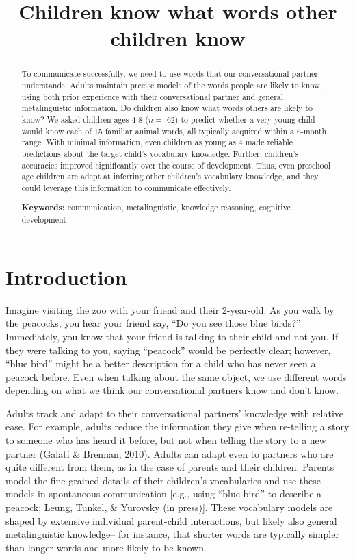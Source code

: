 \documentclass[10pt, letterpaper]{article}
\title{Children know what words other children know}
\begin{document}
\maketitle

\begin{abstract}
To communicate successfully, we need to use words that our
conversational partner understands. Adults maintain precise models of
the words people are likely to know, using both prior experience with
their conversational partner and general metalinguistic information. Do
children also know what words others are likely to know? We asked
children ages 4-8 (\(n =\) 62) to predict whether a very young child
would know each of 15 familiar animal words, all typically acquired
within a 6-month range. With minimal information, even children as young
as 4 made reliable predictions about the target child's vocabulary
knowledge. Further, children's accuracies improved significantly over
the course of development. Thus, even preschool age children are adept
at inferring other children's vocabulary knowledge, and they could
leverage this information to communicate effectively.

\textbf{Keywords:}
communication, metalinguistic, knowledge reasoning, cognitive
development
\end{abstract}

\hypertarget{introduction}{%
\section{Introduction}\label{introduction}}

Imagine visiting the zoo with your friend and their 2-year-old. As you
walk by the peacocks, you hear your friend say, ``Do you see those blue
birds?'' Immediately, you know that your friend is talking to their
child and not you. If they were talking to you, saying ``peacock'' would
be perfectly clear; however, ``blue bird'' might be a better description
for a child who has never seen a peacock before. Even when talking about
the same object, we use different words depending on what we think our
conversational partners know and don't know.

Adults track and adapt to their conversational partners' knowledge with
relative ease. For example, adults reduce the information they give when
re-telling a story to someone who has heard it before, but not when
telling the story to a new partner (Galati \& Brennan, 2010). Adults can
adapt even to partners who are quite different from them, as in the case
of parents and their children. Parents model the fine-grained details of
their children's vocabularies and use these models in spontaneous
communication {[}e.g., using ``blue bird'' to describe a peacock; Leung,
Tunkel, \& Yurovsky (in press){]}. These vocabulary models are shaped by
extensive individual parent-child interactions, but likely also general
metalinguistic knowledge-- for instance, that shorter words are
typically simpler than longer words and more likely to be known.
\end{document}
